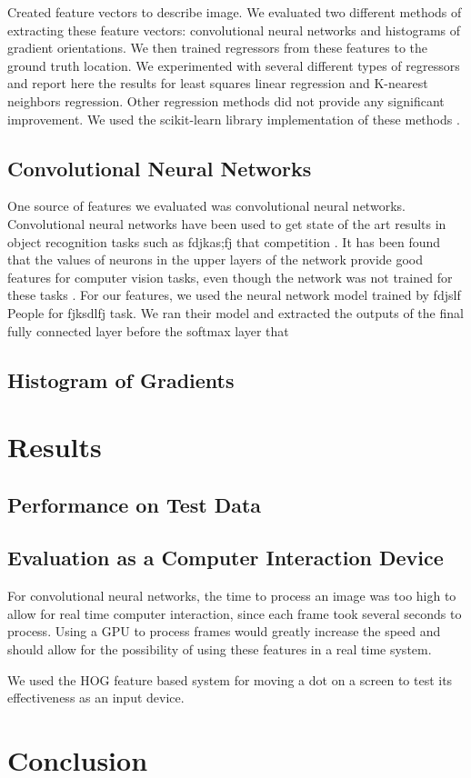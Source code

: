 \documentclass[10pt,twocolumn,letterpaper]{article}
\begin{document}
Created feature vectors to describe image.  We evaluated two different methods of extracting these feature vectors: convolutional neural networks and histograms of gradient orientations.  We then trained regressors from these features to the ground truth location.  We experimented with several different types of regressors and report here the results for least squares linear regression and K-nearest neighbors regression.  Other regression methods did not provide any significant improvement.  We used the scikit-learn library implementation of these methods \cite{scikit-learn}.

\subsection{Convolutional Neural Networks}

One source of features we evaluated was convolutional neural networks.  Convolutional neural networks have been used to get state of the art results in object recognition tasks such as fdjkas;fj that competition \cite{something}.  It has been found that the values of neurons in the upper layers of the network provide good features for computer vision tasks, even though the network was not trained for these tasks \cite{something}.  For our features, we used the neural network model trained by fdjslf People for fjksdlfj task.  \cite{jia2014caffe}  We ran their model and extracted the outputs of the final fully connected layer before the softmax layer that 

\subsection{Histogram of Gradients}

\cite{dalal2005histograms}

\section{Results}

\subsection{Performance on Test Data}

\subsection{Evaluation as a Computer Interaction Device}

For convolutional neural networks, the time to process an image was too high to allow for real time computer interaction, since each frame took several seconds to process.  Using a GPU to process frames would greatly increase the speed and should allow for the possibility of using these features in a real time system.

We used the HOG feature based system for moving a dot on a screen to test its effectiveness as an input device.

\section{Conclusion}


{\small


}
\end{document}
